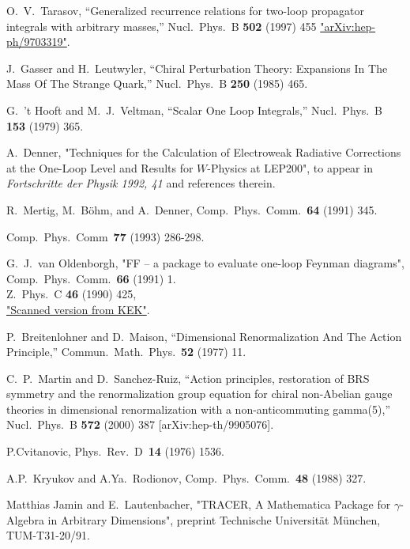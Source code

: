 \begin{thebibliography}{99}
O.~V.~Tarasov,
``Generalized recurrence relations for two-loop propagator integrals with  arbitrary masses,''
Nucl.\ Phys.\ B {\bf 502} (1997) 455
\href{http://xxx.lanl.gov/abs/hep-ph/9703319}{"arXiv:hep-ph/9703319"}.

J.~Gasser and H.~Leutwyler,
``Chiral Perturbation Theory: Expansions In The Mass Of The Strange Quark,''
Nucl.\ Phys.\ B {\bf 250} (1985) 465.

G.~'t Hooft and M.~J.~Veltman,
``Scalar One Loop Integrals,''
Nucl.\ Phys.\ B {\bf 153} (1979) 365.

A.~Denner,  "Techniques for the Calculation of Electroweak
Radiative Corrections at the One-Loop Level and Results for
$W$-Physics at LEP200",
to appear in {\sl Fortschritte der Physik 1992, 41}
and references therein.

 R.~Mertig, M.~B\"ohm, and A.~Denner,
Comp.~Phys.~Comm.~{\bf 64} (1991) 345.

Comp.~Phys.~Comm~{\bf 77} (1993) 286-298.

G.~J.~van Oldenborgh, "FF -- a package to evaluate one-loop Feynman diagrams",
Comp.~Phys.~Comm.~{\bf 66} (1991) 1.\\
Z.\ Phys.\ C {\bf 46} (1990) 425,\\
\href{http://ccdb3fs.kek.jp/cgi-bin/img_index?9004168}{"Scanned version from KEK"}.

P.~Breitenlohner and D.~Maison,
``Dimensional Renormalization And The Action Principle,''
Commun.\ Math.\ Phys.\  {\bf 52} (1977) 11.

C.~P.~Martin and D.~Sanchez-Ruiz,
``Action principles, restoration of BRS symmetry and the renormalization  group equation for chiral non-Abelian gauge theories in dimensional
renormalization with a non-anticommuting gamma(5),''
Nucl.\ Phys.\ B {\bf 572} (2000) 387
[arXiv:hep-th/9905076].

P.Cvitanovic, Phys.~Rev.~D~{\bf 14} (1976) 1536.

A.P.~Kryukov and A.Ya.~Rodionov, Comp.~Phys.~Comm.~{\bf 48} (1988)
327.

Matthias Jamin and E.~Lautenbacher,
"TRACER, A Mathematica Package for $\gamma$-Algebra in Arbitrary Dimensions",
preprint Technische Universit\"at M\"unchen, TUM-T31-20/91.


\end{thebibliography}
